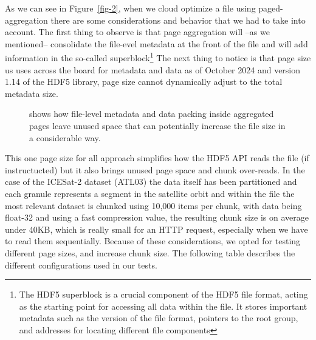 \documentclass[
]{agujournal2019}
\begin{document}
As we can see in Figure~\ref{fig-2}, when we cloud optimize a file using
paged-aggregation there are some considerations and behavior that we had
to take into account. The first thing to observe is that page
aggregation will --as we mentioned-- consolidate the file-evel metadata
at the front of the file and will add information in the so-called
superblock\footnote{The HDF5 superblock is a crucial component of the
  HDF5 file format, acting as the starting point for accessing all data
  within the file. It stores important metadata such as the version of
  the file format, pointers to the root group, and addresses for
  locating different file components} The next thing to notice is that
page size us uses across the board for metadata and data as of October
2024 and version 1.14 of the HDF5 library, page size cannot dynamically
adjust to the total metadata size.

\begin{figure}


\caption{\label{fig-3}shows how file-level metadata and data packing
inside aggregated pages leave unused space that can potentially increase
the file size in a considerable way.}

\end{figure}%

This one page size for all approach simplifies how the HDF5 API reads
the file (if instructucted) but it also brings unused page space and
chunk over-reads. In the case of the ICESat-2 dataset (ATL03) the data
itself has been partitioned and each granule represents a segment in the
satellite orbit and within the file the most relevant dataset is chunked
using 10,000 items per chunk, with data being float-32 and using a fast
compression value, the resulting chunk size is on average under 40KB,
which is really small for an HTTP request, especially when we have to
read them sequentially. Because of these considerations, we opted for
testing different page sizes, and increase chunk size. The following
table describes the different configurations used in our tests.
\end{document}
